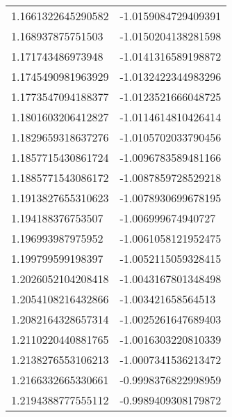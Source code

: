 \begin{supertabular}{ll}
1.1661322645290582  & -1.0159084729409391   \\
1.168937875751503   & -1.0150204138281598   \\
1.171743486973948   & -1.0141316589198872   \\
1.1745490981963929  & -1.0132422344983296   \\
1.1773547094188377  & -1.0123521666048725   \\
1.1801603206412827  & -1.0114614810426414   \\
1.1829659318637276  & -1.0105702033790456   \\
1.1857715430861724  & -1.0096783589481166   \\
1.1885771543086172  & -1.0087859728529218   \\
1.1913827655310623  & -1.0078930699678195   \\
1.194188376753507   & -1.006999674940727    \\
1.196993987975952   & -1.0061058121952475   \\
1.199799599198397   & -1.0052115059328415   \\
1.2026052104208418  & -1.0043167801348498   \\
1.2054108216432866  & -1.003421658564513    \\
1.2082164328657314  & -1.0025261647689403   \\
1.2110220440881765  & -1.0016303220810339   \\
1.2138276553106213  & -1.0007341536213472   \\
1.2166332665330661  & -0.9998376822998959   \\
1.2194388777555112  & -0.9989409308179872   \\
\end{supertabular}
